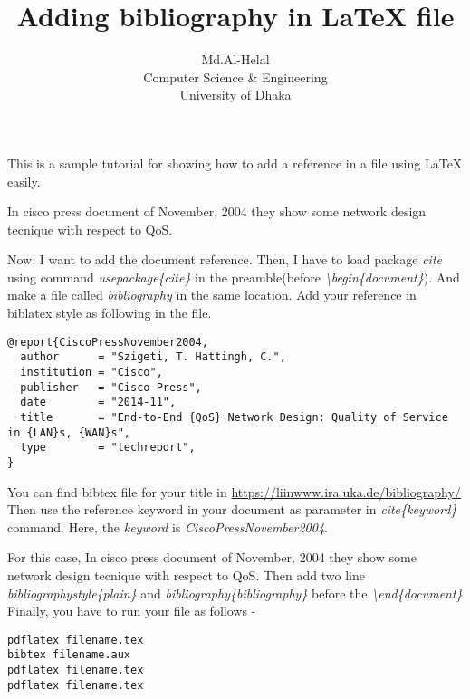 \documentclass[a4paper,11pt]{article}
\begin{document}
\title{Adding bibliography in \LaTeX{} file}
\author{Md.Al-Helal\\Computer Science \& Engineering\\University of Dhaka}
\maketitle
This is a sample tutorial for showing how to add a reference in a file using \LaTeX{} easily.

In cisco press document of November, 2004 they show some network design tecnique with respect to QoS.

Now, I want to add the document reference. Then, I have to load package \textit{cite} using command \textit{usepackage\{cite\}} in the preamble(before \textit{\textbackslash begin\{document\}}). And make a file called \textit{bibliography} in the same location. Add your reference in biblatex style as following in the file.
\begin{verbatim}
@report{CiscoPressNovember2004,
  author      = "Szigeti, T. Hattingh, C.",
  institution = "Cisco",
  publisher   = "Cisco Press",
  date        = "2014-11",
  title       = "End-to-End {QoS} Network Design: Quality of Service in {LAN}s, {WAN}s",
  type        = "techreport",
}
\end{verbatim}
You can find bibtex file for your title in \url{https://liinwww.ira.uka.de/bibliography/}
Then use the reference keyword in your document as parameter in \textit{cite\{keyword\}} command. Here, the \textit{keyword} is \textit{CiscoPressNovember2004}.

For this case, In cisco press document of November, 2004\cite{CiscoPressNovember2004} they show some network design tecnique with respect to QoS.
Then add two line \textit{bibliographystyle\{plain\}} and \textit{bibliography\{bibliography\}} before the \textit{\textbackslash end\{document\}}
Finally, you have to run your file as follows - 
\begin{verbatim}
pdflatex filename.tex
bibtex filename.aux
pdflatex filename.tex
pdflatex filename.tex
\end{verbatim}


\end{document}
